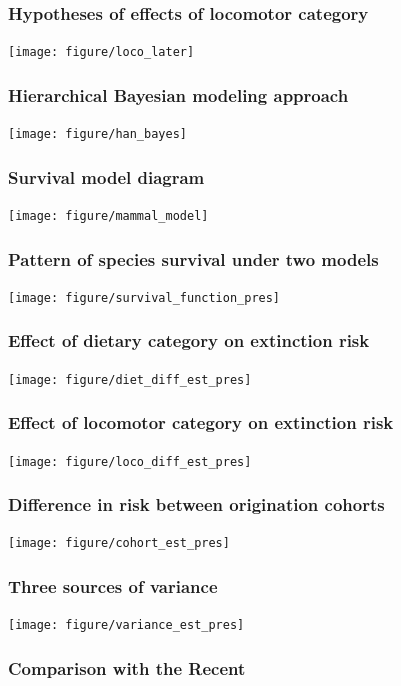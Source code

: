 \documentclass{beamer}
\begin{document}
\begin{frame}
  \frametitle{Hypotheses of effects of locomotor category}
  \begin{center}
    \texttt{[image: figure/loco\_later]}
  \end{center}
\end{frame}

\begin{frame}
  \frametitle{Hierarchical Bayesian modeling approach}

  \texttt{[image: figure/han\_bayes]}

  \tiny{}
\end{frame}

\begin{frame}
  \frametitle{Survival model diagram}
  \begin{center}
    \texttt{[image: figure/mammal\_model]}
  \end{center}
\end{frame}

\begin{frame}
  \frametitle{Pattern of species survival under two models}
  
  \texttt{[image: figure/survival\_function\_pres]}
\end{frame}

\begin{frame}
  \frametitle{Effect of dietary category on extinction risk}
  
  \texttt{[image: figure/diet\_diff\_est\_pres]}
\end{frame}

\begin{frame}
  \frametitle{Effect of locomotor category on extinction risk}
  
  \texttt{[image: figure/loco\_diff\_est\_pres]}
\end{frame}

\begin{frame}
  \frametitle{Difference in risk between origination cohorts}
  
  \texttt{[image: figure/cohort\_est\_pres]}
\end{frame}

\begin{frame}
  \frametitle{Three sources of variance}
  
  \texttt{[image: figure/variance\_est\_pres]}
\end{frame}

\begin{frame}
  \frametitle{Comparison with the Recent}
\end{frame}
\end{document}
